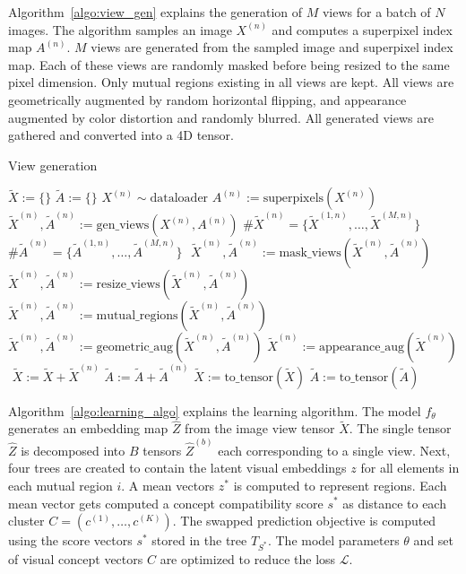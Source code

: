 \documentclass{bmvc2k}
\begin{document}
Algorithm~\ref{algo:view_gen} explains the generation of $M$ views for a batch of $N$ images. The algorithm samples an image $X^{(n)}$ and computes a superpixel index map $A^{(n)}$. $M$ views are generated from the sampled image and superpixel index map. Each of these views are randomly masked before being resized to the same pixel dimension. Only mutual regions existing in all views are kept. All views are geometrically augmented by random horizontal flipping, and appearance augmented by color distortion and randomly blurred. All generated views are gathered and converted into a 4D tensor.

\begin{algorithm}
\caption{View generation}
\label{algo:view_gen}
\begin{algorithmic}
\State $\tilde{X} := \{\}$ 
\State $\tilde{A} := \{\}$
    \State $X^{(n)} \sim \text{dataloader}$ 
    \State $A^{(n)} := \text{superpixels}(X^{(n)})$
    \State $ $
    \State $\tilde{X}^{(n)}, \tilde{A}^{(n)} := \text{gen\_views}(X^{(n)}, A^{(n)})$
    \State $\text{\# } \tilde{X}^{(n)} = \{ \tilde{X}^{(1,n)}, \dots, \tilde{X}^{(M,n)} \}$
    \State $\text{\# } \tilde{A}^{(n)} = \{ \tilde{A}^{(1,n)}, \dots, \tilde{A}^{(M,n)} \}$
    \State $ $
    \State $\tilde{X}^{(n)}, \tilde{A}^{(n)} := \text{mask\_views}(\tilde{X}^{(n)}, \tilde{A}^{(n)})$
    \State $\tilde{X}^{(n)}, \tilde{A}^{(n)} := \text{resize\_views}(\tilde{X}^{(n)}, \tilde{A}^{(n)})$
    \State $\tilde{X}^{(n)}, \tilde{A}^{(n)} := \text{mutual\_regions}(\tilde{X}^{(n)}, \tilde{A}^{(n)})$
    \State $ $
    \State $\tilde{X}^{(n)}, \tilde{A}^{(n)} := \text{geometric\_aug}(\tilde{X}^{(n)}, \tilde{A}^{(n)})$
    \State $\tilde{X}^{(n)} := \text{appearance\_aug}(\tilde{X}^{(n)})$
    \State $ $
    \State $\tilde{X} := \tilde{X} + \tilde{X}^{(n)}$ 
    \State $\tilde{A} := \tilde{A} + \tilde{A}^{(n)}$
\EndFor
\State $\tilde{X} := \text{to\_tensor}(\tilde{X})$ 
\State $\tilde{A} := \text{to\_tensor}(\tilde{A})$ 
\end{algorithmic}
\end{algorithm}

Algorithm~\ref{algo:learning_algo} explains the learning algorithm. The model $f_{\theta}$ generates an embedding map $\hat{Z}$ from the image view tensor $\tilde{X}$. The single tensor $\hat{Z}$ is decomposed into $B$ tensors $\hat{Z}^{(b)}$ each corresponding to a single view. Next, four trees are created to contain the latent visual embeddings $z$ for all elements in each mutual region $i$. A mean vectors $z^*$ is computed to represent regions. Each mean vector gets computed a concept compatibility score $s^*$ as distance to each cluster $C = (c^{(1)}, \dots , c^{(K)})$. The swapped prediction objective is computed using the score vectors $s^*$ stored in the tree $T_{S^*}$. The model parameters $\theta$ and set of visual concept vectors $C$ are optimized to reduce the loss $\mathcal{L}$.
\end{document}
